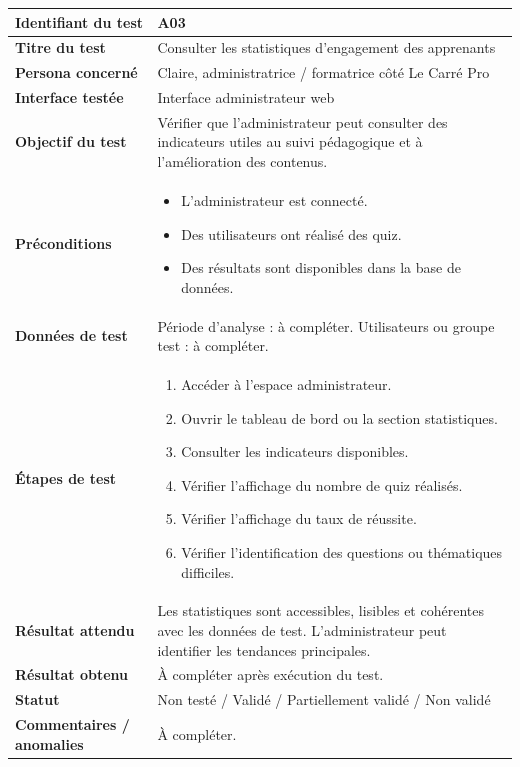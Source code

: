 \begin{longtable}{|p{4cm}|p{10cm}|}
\textbf{Identifiant du test} & A03 \\ \hline
\textbf{Titre du test} & Consulter les statistiques d'engagement des apprenants \\ \hline
\textbf{Persona concerné} & Claire, administratrice / formatrice côté Le Carré Pro \\ \hline
\textbf{Interface testée} & Interface administrateur web \\ \hline
\textbf{Objectif du test} & Vérifier que l'administrateur peut consulter des indicateurs utiles au suivi pédagogique et à l'amélioration des contenus. \\ \hline
\textbf{Préconditions} &
\begin{itemize}
    \item L'administrateur est connecté.
    \item Des utilisateurs ont réalisé des quiz.
    \item Des résultats sont disponibles dans la base de données.
\end{itemize}
\\ \hline
\textbf{Données de test} & 
Période d'analyse : à compléter. \newline
Utilisateurs ou groupe test : à compléter. \\ \hline
\textbf{Étapes de test} &
\begin{enumerate}
    \item Accéder à l'espace administrateur.
    \item Ouvrir le tableau de bord ou la section statistiques.
    \item Consulter les indicateurs disponibles.
    \item Vérifier l'affichage du nombre de quiz réalisés.
    \item Vérifier l'affichage du taux de réussite.
    \item Vérifier l'identification des questions ou thématiques difficiles.
\end{enumerate}
\\ \hline
\textbf{Résultat attendu} & 
Les statistiques sont accessibles, lisibles et cohérentes avec les données de test. L'administrateur peut identifier les tendances principales. \\ \hline
\textbf{Résultat obtenu} & À compléter après exécution du test. \\ \hline
\textbf{Statut} & Non testé / Validé / Partiellement validé / Non validé \\ \hline
\textbf{Commentaires / anomalies} & À compléter. \\
\end{longtable}
\endgroup

